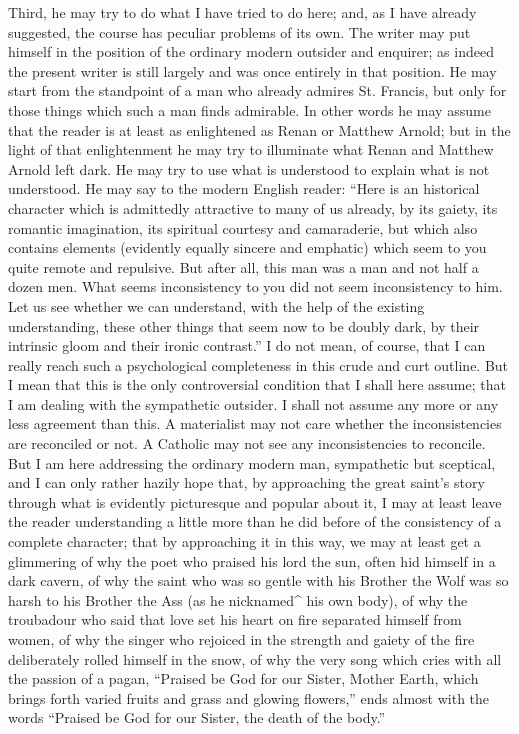 \documentclass{book}
\begin{document}
Third, he may try to do what I have tried to do here; and, as I have already suggested, the course has peculiar problems of its own. The writer may put himself in the position of the ordinary modern outsider and enquirer; as indeed the present writer is still largely and was once entirely in that position. He may start from the standpoint of a man who already admires St. Francis, but only for those things which such a man finds admirable. In other words he may assume that the reader is at least as enlightened as Renan or Matthew Arnold; but in the light of that enlightenment he may try to illuminate what Renan and Matthew Arnold left dark. He may try to use what is understood to explain what is not understood. He may say to the modern English reader: “Here is an historical character which is admittedly attractive to many of us already, by its gaiety, its romantic imagination, its spiritual courtesy and camaraderie, but which also contains elements (evidently equally sincere and emphatic) which seem to you quite remote and repulsive. But after all, this man was a man and not half a dozen men. What seems inconsistency to you did not seem inconsistency to him. Let us see whether we can understand, with the help of the existing understanding, these other things that seem now to be doubly dark, by their intrinsic gloom and their ironic contrast.” I do not mean, of course, that I can really reach such a psychological completeness in this crude and curt outline. But I mean that this is the only controversial condition that I shall here assume; that I am dealing with the sympathetic outsider. I shall not assume any more or any less agreement than this. A materialist may not care whether the inconsistencies are reconciled or not. A Catholic may not see any inconsistencies to reconcile. But I am here addressing the ordinary modern man, sympathetic but sceptical, and I can only rather hazily hope that, by approaching the great saint’s story through what is evidently picturesque and popular about it, I may at least leave the reader understanding a little more than he did before of the consistency of a complete character; that by approaching it in this way, we may at least get a glimmering of why the poet who praised his lord the sun, often hid himself in a dark cavern, of why the saint who was so gentle with his Brother the Wolf was so harsh to his Brother the Ass (as he nicknamed\textasciicircum{} his own body), of why the troubadour who said that love set his heart on fire separated himself from women, of why the singer who rejoiced in the strength and gaiety of the fire deliberately rolled himself in the snow, of why the very song which cries with all the passion of a pagan, “Praised be God for our Sister, Mother Earth, which brings forth varied fruits and grass and glowing flowers,” ends almost with the words “Praised be God for our Sister, the death of the body.”
\end{document}
